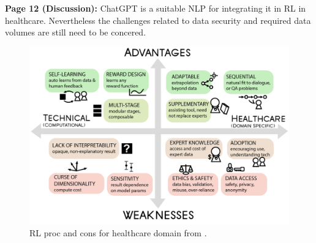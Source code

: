     \textbf{Page 12 (Discussion):}
    ChatGPT is a suitable NLP for integrating it in RL in healthcare. Nevertheless the challenges related to data security and required data volumes are still need to be concered. 
    \begin{figure}[H]
        \centering
        \includegraphics[width=1\textwidth]{figures/0022_SR06US23/fig6.png}
        \caption{RL proc and cons for healthcare domain from \cite{x090}.}
        \label{fig6:0022_SR06US23}
    \end{figure}